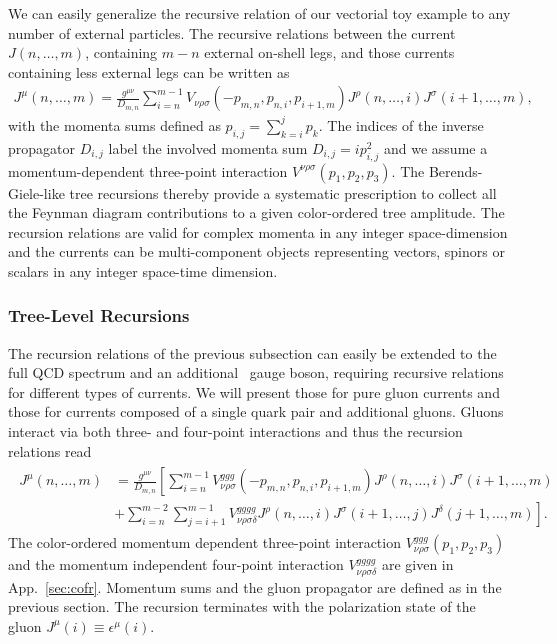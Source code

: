 \vspace{-0.5cm}
We can easily generalize the recursive relation of our vectorial toy example to any number of external particles. The
recursive relations between the current $J(n,\dots,m)$, containing $m-n$ external on-shell legs, and those currents containing
less external legs can be written as
\begin{align}\label{eq:rectoy}
  J^\mu(n,\dots,m) = \frac{g^{\mu\nu}}{D_{m,n}}\sum_{i=n}^{m-1}V_{\nu\rho\sigma}(-p_{m,n},p_{n,i},p_{i+1,m})J^\rho(n,\dots,i) J^\sigma(i+1,\dots,m),
\end{align}
with the momenta sums defined as $p_{i,j}=\sum_{k=i}^jp_k$. The
indices of the inverse propagator $D_{i,j}$ label the involved
momenta sum $D_{i,j}=ip_{i,j}^2$ and we assume a momentum-dependent three-point interaction
$V^{\nu\rho\sigma}(p_1,p_2,p_3).$ The Berends-Giele-like tree recursions thereby provide a
systematic prescription to collect all the Feynman diagram contributions to a given
color-ordered tree amplitude. The recursion relations are valid for complex momenta in any
integer space-dimension and the currents can be multi-component
objects representing vectors, spinors or scalars in any integer
space-time dimension.


\subsubsection{Tree-Level Recursions}
\label{sec:bgqcd}
The recursion relations of the previous subsection can easily be extended to the full QCD
spectrum and an additional \ew~gauge boson, requiring recursive relations for different types of currents. We will present those for
pure gluon currents and those for currents composed of a single quark
pair and additional gluons. Gluons interact via both three- and
four-point interactions and thus the recursion relations read
\begin{align}\label{eq:recglue}
\begin{split}
  J^\mu(n,\dots,m) &=
  \frac{g^{\mu\nu}}{D_{m,n}}\left[\sum_{i=n}^{m-1}V_{\nu\rho\sigma}^{ggg}(-p_{m,n},p_{n,i},p_{i+1,m})J^\rho(n,\dots,i)
  J^\sigma(i+1,\dots,m)\right.\\
 &\left.+\sum_{i=n}^{m-2}\sum_{j=i+1}^{m-1}V_{\nu\rho\sigma\delta}^{gggg}J^\rho(n,\dots,i)
   J^\sigma(i+1,\dots,j)J^\delta(j+1,\dots,m)\right].
\end{split}
\end{align}
The color-ordered momentum dependent three-point interaction
$V_{\nu\rho\sigma}^{ggg}(p_1,p_2,p_3)$ and the momentum independent
four-point interaction $V_{\nu\rho\sigma\delta}^{gggg}$ are given in App.~\ref{sec:cofr}. Momentum sums
and the gluon propagator are defined as in the previous section. The
recursion terminates with the polarization state of the gluon
$J^\mu(i)\equiv\epsilon^\mu(i)$.


